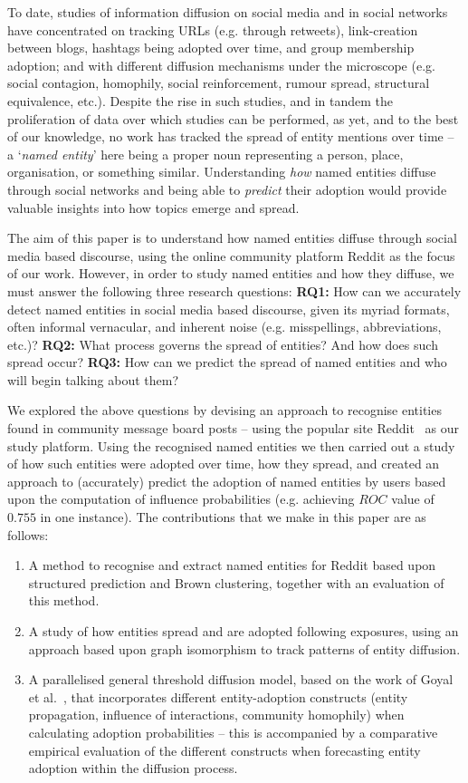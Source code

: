 \documentclass[sigconf,anonymous,review]{acmart}
\begin{document}
To date, studies of information diffusion on social media and in social networks have concentrated on tracking URLs (e.g. through retweets), link-creation between blogs, hashtags being adopted over time, and group membership adoption; and with different diffusion mechanisms under the microscope (e.g. social contagion, homophily, social reinforcement, rumour spread, structural equivalence, etc.).
Despite the rise in such studies, and in tandem the proliferation of data over which studies can be performed, as yet, and to the best of our knowledge, no work has tracked the spread of entity mentions over time -- a `\emph{named entity}' here being a proper noun representing a person, place, organisation, or something similar.
Understanding \emph{how} named entities diffuse through social networks and being able to \emph{predict} their adoption would provide valuable insights into how topics emerge and spread.

The aim of this paper is to understand how named entities diffuse through social media based discourse, using the online community platform Reddit as the focus of our work.
However, in order to study named entities and how they diffuse, we must answer the following three research questions: \textbf{RQ1:} How can we accurately detect named entities in social media based discourse, given its myriad formats, often informal vernacular, and inherent noise (e.g. misspellings, abbreviations, etc.)? \textbf{RQ2:} What process governs the spread of entities? And how does such spread occur? \textbf{RQ3:} How can we predict the spread of named entities and who will begin talking about them?	

We explored the above questions by devising an approach to recognise entities found in community message board posts -- using the popular site Reddit~\cite{duggan20136} as our study platform.
Using the recognised named entities we then carried out a study of how such entities were adopted over time, how they spread, and created an approach to (accurately) predict the adoption of named entities by users based upon the computation of influence probabilities (e.g. achieving $ROC$ value of $0.755$ in one instance).
The contributions that we make in this paper are as follows:

\begin{enumerate}
	\item A method to recognise and extract named entities for Reddit based upon structured prediction and Brown clustering, together with an evaluation of this method.
	\item A study of how entities spread and are adopted following exposures, using an approach based upon graph isomorphism to track patterns of entity diffusion.
	\item A parallelised general threshold diffusion model, based on the work of Goyal et al.~\cite{goyal2010learning}, that incorporates different entity-adoption constructs (entity propagation, influence of interactions, community homophily) when calculating adoption probabilities -- this is accompanied by a comparative empirical evaluation of the different constructs when forecasting entity adoption within the diffusion process.
\end{enumerate}
\end{document}
